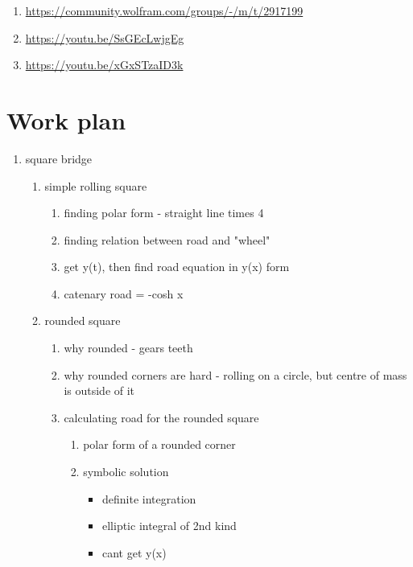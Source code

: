 \documentclass[12pt]{article}
\begin{document}
        \begin{enumerate}
            \item \url{https://community.wolfram.com/groups/-/m/t/2917199}
            \item \url{https://youtu.be/SsGEcLwjgEg}
            \item \url{https://youtu.be/xGxSTzaID3k}
        \end{enumerate}

    \newpage

    \section{Work plan}

        \begin{enumerate}
            \item square bridge \begin{enumerate}
                \item simple rolling square \begin{enumerate}
                    \item finding polar form - straight line times 4
                    \item finding relation between road and "wheel"
                    \item get y(t), then find road equation in y(x) form
                    \item catenary road = -cosh x
                \end{enumerate}
                \item rounded square \begin{enumerate}
                    \item why rounded - gears teeth
                    \item why rounded corners are hard - rolling on a circle, but centre of mass is outside of it
                    \item calculating road for the rounded square \begin{enumerate}
                        \item polar form of a rounded corner
                        \item symbolic solution \begin{itemize}
                            \item definite integration
                            \item elliptic integral of 2nd kind
                            \item cant get y(x)

\end{itemize}
\end{enumerate}
\end{enumerate}
\end{enumerate}
\end{enumerate}
\end{document}
